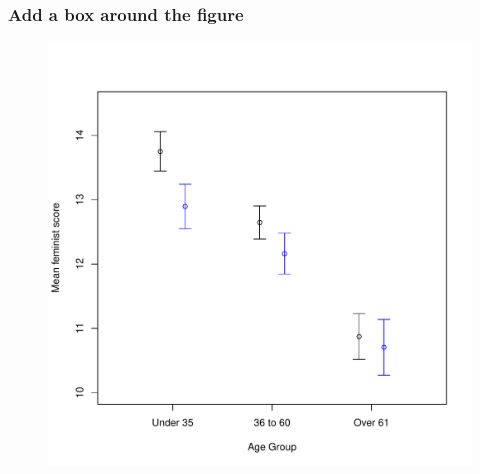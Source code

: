 \documentclass{beamer}\usepackage[]{graphicx}\usepackage[]{color}
\begin{document}
\begin{frame}[fragile]
  \frametitle{Add a box around the figure}

\begin{figure}[h]
  \vspace{-20pt}
  \centering
  \includegraphics[height = 0.7\textwidth, keepaspectratio]{Figure/m9}
  \label{fig:m9}
\end{figure}
\end{frame} 
\end{document}
